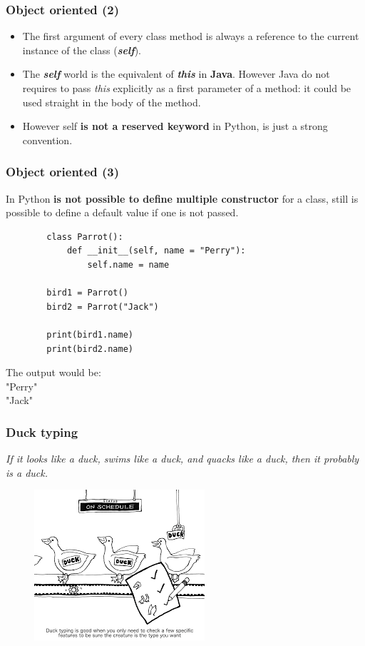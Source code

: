 \documentclass[xcolor ={table,usenames,dvipsnames}]{beamer}
\theoremstyle{definition}
\begin{document}
	\begin{frame}[fragile]
		\frametitle{Object oriented (2)}
		\begin{itemize}
			\item The first argument of every class method is always a reference to the current instance of the class (\textit{\textbf{self}}).
			\item The \textbf{\textit{self}} world is the equivalent of \textbf{\textit{this}} in \textbf{Java}. However Java do not requires to pass \textit{this} explicitly as a first parameter of a method: it could be used straight in the body of the method.
			\item However self\textbf{ is not a reserved keyword} in Python, is just a strong convention.
		\end{itemize}
	\end{frame}

	\begin{frame}[fragile]
		\frametitle{Object oriented (3)}
		In Python \textbf{is not possible to define multiple constructor} for a class, still is possible to define a default value if one is not passed.
		
		\begin{lstlisting}
		class Parrot():
			def __init__(self, name = "Perry"):
				self.name = name
		
		bird1 = Parrot()
		bird2 = Parrot("Jack")
		
		print(bird1.name)
		print(bird2.name)
		\end{lstlisting}
		The output would be:\\
		"Perry"\\
		"Jack"
	\end{frame}

	\begin{frame}
		\frametitle{Duck typing}
		\textit{ If it looks like a duck, swims like a duck, and quacks like a duck, then it probably is a duck.}\\
		\begin{figure}[h!]
			\centering
			\includegraphics[scale=0.85]{img/duck.png}
			\label{Interfacce di un CS}
		\end{figure}
	\end{frame}
\end{document}
